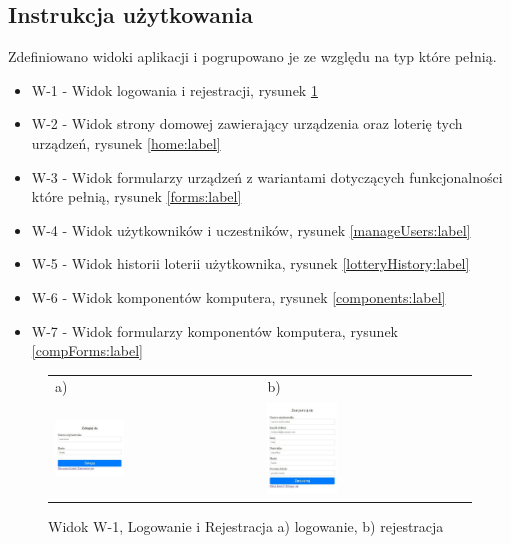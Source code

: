 \subsection{Instrukcja użytkowania}

Zdefiniowano widoki aplikacji i pogrupowano je ze względu na typ które pełnią.
\begin{itemize}
	\item W-1 - Widok logowania i rejestracji, rysunek \ref{authview:label}
	\item W-2 - Widok strony domowej zawierający urządzenia oraz loterię tych urządzeń, rysunek \ref{home:label}
	\item W-3 - Widok formularzy urządzeń z wariantami dotyczących funkcjonalności które pełnią, rysunek \ref{forms:label}
	\item W-4 - Widok użytkowników i uczestników, rysunek \ref{manageUsers:label}
	\item W-5 - Widok historii loterii użytkownika, rysunek \ref{lotteryHistory:label}
	\item W-6 - Widok komponentów komputera, rysunek \ref{components:label}
	\item W-7 - Widok formularzy komponentów komputera, rysunek \ref{compForms:label}
\end{itemize} 





\begin{figure}[htb]
  \centering
	\begin{tabular}{@{}ll@{}}
	a) & b) \\
  \includegraphics[width=0.35\textwidth]{rys05/view/login.pdf} & 
	\includegraphics[width=0.35\textwidth]{rys05/view/register.pdf}
	\end{tabular}
  \caption{Widok W-1, Logowanie i Rejestracja a) logowanie, b) rejestracja}
  \label{authview:label}
\end{figure}


